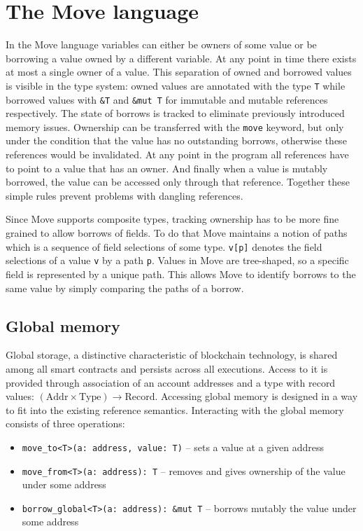 \section{The Move language}

In the Move language variables can either be owners of some value or be borrowing a value owned by a different variable. At any point in time there exists at most a single owner of a value. This separation of owned and borrowed values is visible in the type system: owned values are annotated with the type \lstinline{T} while borrowed values with \lstinline{&T} and \lstinline{&mut T} for immutable and mutable references respectively. The state of borrows is tracked to eliminate previously introduced memory issues. Ownership can be transferred with the \lstinline{move} keyword, but only under the condition that the value has no outstanding borrows, otherwise these references would be invalidated. At any point in the program all references have to point to a value that has an owner. And finally when a value is mutably borrowed, the value can be accessed only through that reference. Together these simple rules prevent problems with dangling references.

Since Move supports composite types, tracking ownership has to be more fine grained to allow borrows of fields. To do that Move maintains a notion of paths which is a sequence of field selections of some type. \lstinline{v[p]} denotes the field selections of a value \lstinline{v} by a path \lstinline{p}. Values in Move are tree-shaped, so a specific field is represented by a unique path. This allows Move to identify borrows to the same value by simply comparing the paths of a borrow.

\subsection{Global memory}

Global storage, a distinctive characteristic of blockchain technology, is shared among all smart contracts and persists across all executions. Access to it is provided through association of an account addresses and a type with record values: $(\text{Addr}\times\text{Type}) \to \text{Record}$. Accessing global memory is designed in a way to fit into the existing reference semantics. Interacting with the global memory consists of three operations:

\begin{itemize}
    \item \lstinline{move_to<T>(a: address, value: T)} -- sets a value at a given address
    \item \lstinline{move_from<T>(a: address): T} -- removes and gives ownership of the value under some address
    \item \lstinline{borrow_global<T>(a: address): &mut T} -- borrows mutably the value under some address
\end{itemize}

